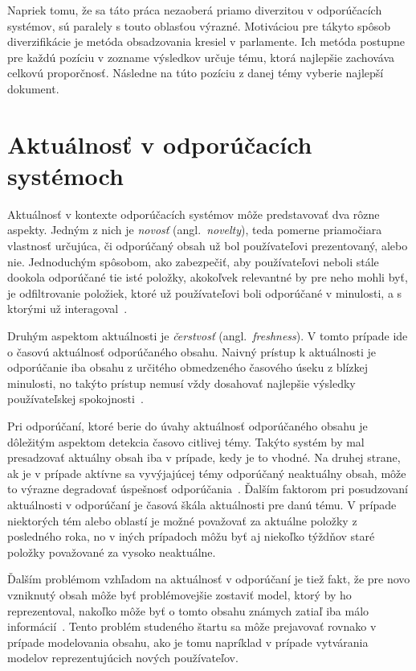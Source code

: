 Napriek tomu, že sa táto práca nezaoberá priamo diverzitou v odporúčacích systémov, sú paralely s touto
oblasťou výrazné. Motiváciou pre tákyto spôsob diverzifikácie je metóda obsadzovania kresiel v parlamente. Ich metóda
postupne pre každú pozíciu v zozname výsledkov určuje tému, ktorá najlepšie zachováva celkovú proporčnosť. Následne
na túto pozíciu z danej témy vyberie najlepší dokument.


\section{Aktuálnosť v odporúčacích systémoch}

Aktuálnosť v kontexte odporúčacích systémov môže predstavovať dva rôzne aspekty. Jedným z nich je \emph{novosť}
(angl.~\emph{novelty}), teda pomerne priamočiara vlastnosť určujúca, či odporúčaný obsah už bol používateľovi prezentovaný,
alebo nie. Jednoduchým spôsobom, ako zabezpečiť, aby používateľovi neboli stále dookola odporúčané tie isté položky,
akokoľvek relevantné by pre neho mohli byť, je odfiltrovanie položiek, ktoré už používateľovi boli odporúčané v minulosti,
a s ktorými už interagoval~\cite{Handbook2011}.

Druhým aspektom aktuálnosti je \emph{čerstvosť} (angl.~\emph{freshness}). V tomto prípade ide o časovú aktuálnosť odporúčaného
obsahu. Naivný prístup k aktuálnosti je odporúčanie iba obsahu z určitého obmedzeného časového úseku z blízkej minulosti,
no takýto prístup nemusí vždy dosahovať najlepšie výsledky používateľskej spokojnosti~\cite{Szpektor2013}.

Pri odporúčaní, ktoré berie do úvahy aktuálnosť odporúčaného obsahu je dôležitým aspektom detekcia časovo citlivej témy.
Takýto systém by mal presadzovať aktuálny obsah iba v prípade, kedy je to vhodné. Na druhej strane, ak je v prípade
aktívne sa vyvýjajúcej témy odporúčaný neaktuálny obsah, môže to výrazne degradovať úspešnosť odporúčania~\cite{Dong2010}.
Ďalším faktorom pri posudzovaní aktuálnosti v odporúčaní je časová škála aktuálnosti pre danú tému.
V prípade niektorých tém alebo oblastí je možné považovať za aktuálne položky z posledného roka, no v iných prípadoch
môžu byť aj niekoľko týždňov staré položky považované za vysoko neaktuálne.

Ďalším problémom vzhľadom na aktuálnosť v odporúčaní je tiež fakt, že pre novo vzniknutý obsah môže byť problémovejšie
zostaviť model, ktorý by ho reprezentoval, nakoľko môže byť o tomto obsahu známych zatiaľ iba málo informácií~\cite{Dong2010TW}.
Tento problém studeného štartu sa môže prejavovať rovnako v prípade modelovania obsahu, ako je tomu napríklad v prípade
vytvárania modelov reprezentujúcich nových používateľov.

